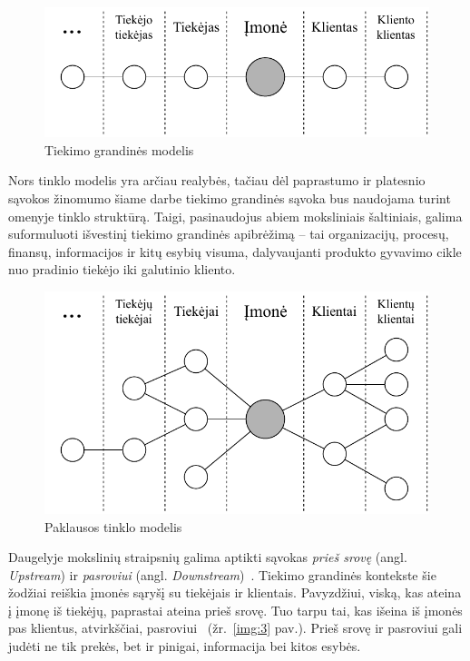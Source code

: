 \begin{figure}[H]
    \centering
    \includegraphics[scale=1]{images/client-supplier-model}
    \caption{Tiekimo grandinės modelis~\cite{christopher2016logistics}}
    \label{img:1}
\end{figure}

Nors tinklo modelis yra arčiau realybės, tačiau dėl paprastumo ir platesnio sąvokos žinomumo šiame darbe tiekimo grandinės sąvoka bus naudojama turint omenyje tinklo struktūrą. Taigi, pasinaudojus abiem moksliniais šaltiniais, galima suformuluoti išvestinį tiekimo grandinės apibrėžimą – tai organizacijų, procesų, finansų, informacijos ir kitų esybių visuma, dalyvaujanti produkto gyvavimo cikle nuo pradinio tiekėjo iki galutinio kliento.

\begin{figure}[H]
    \centering
    \includegraphics[scale=0.8]{images/demand-network-model}
    \caption{Paklausos tinklo modelis~\cite{christopher2016logistics}}
    \label{img:2}
\end{figure}

Daugelyje mokslinių straipsnių galima aptikti sąvokas \textit{prieš srovę} (angl. \textit{Upstream}) ir \textit{pasroviui} (angl. \textit{Downstream})~\cite{croson2005upstream, frohlich2001arcs, vachon2006extending}. Tiekimo grandinės kontekste šie žodžiai reiškia įmonės sąryšį su tiekėjais ir klientais. Pavyzdžiui, viską, kas ateina į įmonę iš tiekėjų, paprastai ateina prieš srovę. Tuo tarpu tai, kas išeina iš įmonės pas klientus, atvirkščiai, pasroviui~\cite{christopher2016logistics} (žr.~\ref{img:3} pav.). Prieš srovę ir pasroviui gali judėti ne tik prekės, bet ir pinigai, informacija bei kitos esybės.

